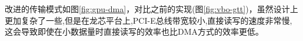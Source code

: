 \begin{itemize}
改进的传输模式如图\ref{fig:gpu-dma}，对比之前的实现(图\ref{fig:vbo-gtt})，虽然设计上更加复杂了一些,但是在龙芯平台上,PCI-E总线带宽较小,直接读写的速度非常慢, 这会导致即使在小数据量时直接读写的效率也比DMA方式的效率更低。

\end{itemize}

